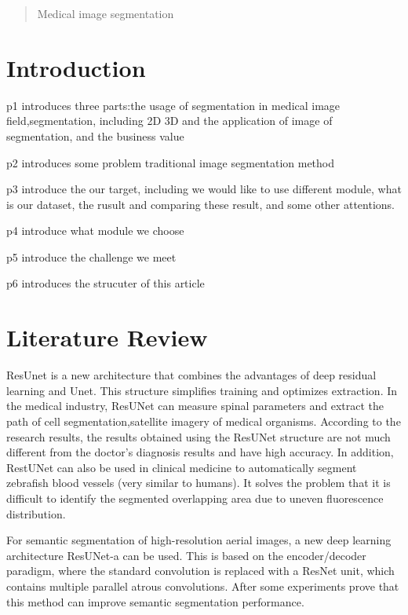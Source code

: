 \documentclass{article}
\begin{document}
\setlength{\parindent}{2em}



\begin{abstract}
    Medical image segmentation
\end{abstract}

\section{Introduction}

p1 introduces three parts:the usage of segmentation in medical image field,segmentation,
including 2D 3D and the application of image of segmentation, and the business value

p2 introduces some problem traditional image segmentation method

p3 introduce the our target, including we would like to use different module, what is our dataset, the rusult and comparing these result, and some other attentions.

p4 introduce what module we choose

p5 introduce the challenge we meet

p6 introduces the strucuter of this article



\section{Literature Review}
ResUnet is a new architecture that combines the advantages of deep residual learning and Unet.\cite{zhang2018road}
This structure simplifies training and optimizes extraction. In the medical industry, ResUNet can measure spinal parameters\cite{weng2019artificial} and extract the path of cell segmentation\cite{lessmann2019iterative},satellite imagery of medical organisms.
According to the research results\cite{weng2019artificial}, the results obtained using the ResUNet structure are not much different from the doctor's diagnosis results and have high accuracy.
In addition, RestUNet can also be used in clinical medicine to automatically segment zebrafish blood vessels (very similar to humans). It solves the problem that it is difficult to identify the segmented overlapping area due to uneven fluorescence distribution.\cite{zhang2019zebrafish}

For semantic segmentation of high-resolution aerial images, a new deep learning architecture ResUNet-a can be used.
This is based on the encoder/decoder paradigm, where the standard convolution is replaced with a ResNet unit, which contains multiple parallel atrous convolutions.
After some experiments prove that this method can improve semantic segmentation performance.\cite{diakogiannis2020resunet}
\end{document}
